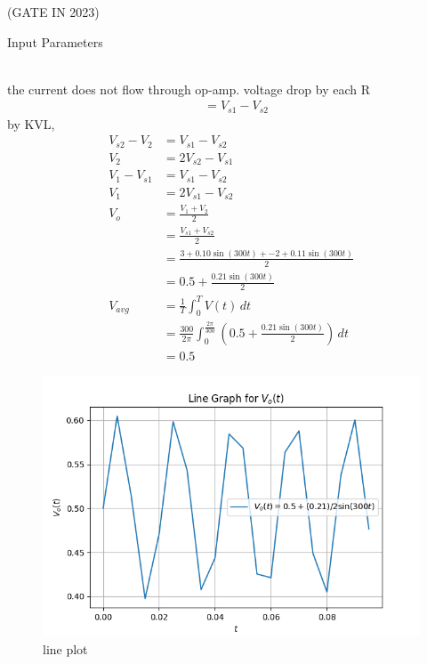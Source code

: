 \documentclass[journal,12pt,twocolumn]{IEEEtran}
\theoremstyle{remark}
\begin{document}
\begin{figure}[ht]
\centering
\resizebox{0.55\columnwidth}{!}{}
\end{figure}
\hfill{(GATE IN 2023)}\\
\solution
\begin{table}[h!]
  \centering
  
  \caption{Input Parameters}
    \label{tab:table1}
\end{table}\\
the current does not flow through op-amp. voltage drop by each R
\begin{align}
&= V_{s1}-V_{s2}
\end{align}
by KVL,
\begin{align}
V_{s2}-V_2&=V_{s1}-V_{s2}\\
V_2&=2V_{s2}-V_{s1}\\
V_1-V_{s1}&=V_{s1}-V_{s2}\\
V_1&= 2V_{s1}-V_{s2}\\
V_o&= \frac{V_1+V_2}{2}\\
&=\frac{V_{s1}+V_{s2}}{2}\\
&=\frac{3+0.10\sin(300t)+{-2}+0.11\sin(300t)}{2}\\
&=0.5+ \frac{0.21\sin(300t)}{2}\\
V_{avg}&=\frac{1}{T} \int_{0}^{T} V(t) \,dt\\
&=\frac{300}{2\pi} \int_{0}^{\frac{2\pi}{300}} \left(0.5 + \frac{0.21 \sin(300t)}{2}\right) \, dt\\
&=0.5
\end{align}
\begin{figure}[b]
    \centering
    \includegraphics[width=\columnwidth]{59/figs/59fig.png}
    \caption{line plot }
    \label{fig:1}
\end{figure}
\end{document}
